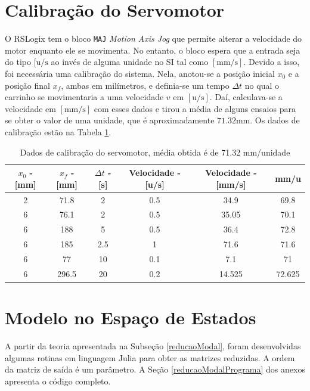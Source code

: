 \section{Calibração do Servomotor\label{calibracaoServomotorSecao}}

O RSLogix tem o bloco \texttt{MAJ} \textendash{} \textit{Motion Axis Jog} \textendash{} que permite alterar a velocidade do motor enquanto ele se movimenta. No entanto, o bloco espera que a entrada seja do tipo $[\mathrm{u}/\mathrm{s}$ ao invés de alguma unidade no SI tal como $[\mathrm{mm}/\mathrm{s}]$. Devido a isso, foi necessária uma calibração do sistema. Nela, anotou-se a posição inicial $x_0$ e a posição final $x_f$, ambas em milímetros, e definia-se um tempo $\Delta t$ no qual o carrinho se movimentaria a uma velocidade $v$ em $[\mathrm{u}/\mathrm{s}]$. Daí, calculava-se a velocidade em $[\mathrm{mm}/\mathrm{s}]$ com esses dados e tirou a média de alguns ensaios para se obter o valor de uma unidade, que é aproximadamente $71.32\mathrm{mm}$. Os dados de calibração estão na Tabela \ref{calibracaoServomotor}.

\begin{table}[!ht]
\centering
\caption{Dados de calibração do servomotor, média obtida é de 71.32 mm/unidade\label{calibracaoServomotor}}
\begin{tabular}{|c|c|c|c|c|c|}
\hline
	$x_0$ - [mm] & $x_f$ - [mm] & $\Delta t$ - [s] & Velocidade - [u/s] & Velocidade - [mm/s] & mm/u\\ \hline
2 &	71.8  &	2   &	0.5 &	34.9   & 	69.8\\ \hline
6 & 76.1  &	2   &	0.5 &	35.05  &	70.1\\ \hline
6 &	188	  &  5   &	0.5	&   36.4   &	72.8\\ \hline
6 &	185   &	2.5 &	1	& 	71.6   &	71.6\\ \hline
6 &	77    &	10  &	0.1	&   7.1    &	71\\ \hline
6 &	296.5 &	20	&   0.2 & 	14.525 &	72.625\\ \hline\end{tabular}
\end{table}

\section{Modelo no Espaço de Estados}

A partir da teoria apresentada na Subseção \ref{reducaoModal}, foram desenvolvidas algumas rotinas em linguagem Julia \cite{julia} para obter as matrizes reduzidas. A ordem da matriz de saída é um parâmetro. A Seção \ref{reducaoModalPrograma} dos anexos apresenta o código completo.

